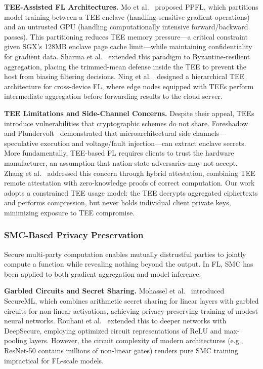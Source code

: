 \textbf{TEE-Assisted FL Architectures.} Mo et al.~\cite{mo2021ppfl} proposed PPFL, which partitions model training between a TEE enclave (handling sensitive gradient operations) and an untrusted GPU (handling computationally intensive forward/backward passes). This partitioning reduces TEE memory pressure---a critical constraint given SGX's 128MB enclave page cache limit---while maintaining confidentiality for gradient data. Sharma et al.~\cite{sharma2022tee} extended this paradigm to Byzantine-resilient aggregation, placing the trimmed-mean defense inside the TEE to prevent the host from biasing filtering decisions. Ning et al.~\cite{ning2023secure} designed a hierarchical TEE architecture for cross-device FL, where edge nodes equipped with TEEs perform intermediate aggregation before forwarding results to the cloud server.

\textbf{TEE Limitations and Side-Channel Concerns.} Despite their appeal, TEEs introduce vulnerabilities that cryptographic schemes do not share. Foreshadow~\cite{vanbulck2018foreshadow} and Plundervolt~\cite{murdock2020plundervolt} demonstrated that microarchitectural side channels---speculative execution and voltage/fault injection---can extract enclave secrets. More fundamentally, TEE-based FL requires clients to trust the hardware manufacturer, an assumption that nation-state adversaries may not accept. Zhang et al.~\cite{zhang2021enabling} addressed this concern through hybrid attestation, combining TEE remote attestation with zero-knowledge proofs of correct computation. Our work adopts a constrained TEE usage model: the TEE decrypts aggregated ciphertexts and performs compression, but never holds individual client private keys, minimizing exposure to TEE compromise.

\subsubsection{SMC-Based Privacy Preservation}
\label{subsubsec:smc-based}

Secure multi-party computation enables mutually distrustful parties to jointly compute a function while revealing nothing beyond the output. In FL, SMC has been applied to both gradient aggregation and model inference.

\textbf{Garbled Circuits and Secret Sharing.} Mohassel et al.~\cite{mohassel2017secureml} introduced SecureML, which combines arithmetic secret sharing for linear layers with garbled circuits for non-linear activations, achieving privacy-preserving training of modest neural networks. Rouhani et al.~\cite{rouhani2018deepsecure} extended this to deeper networks with DeepSecure, employing optimized circuit representations of ReLU and max-pooling layers. However, the circuit complexity of modern architectures (e.g., ResNet-50 contains millions of non-linear gates) renders pure SMC training impractical for FL-scale models.

